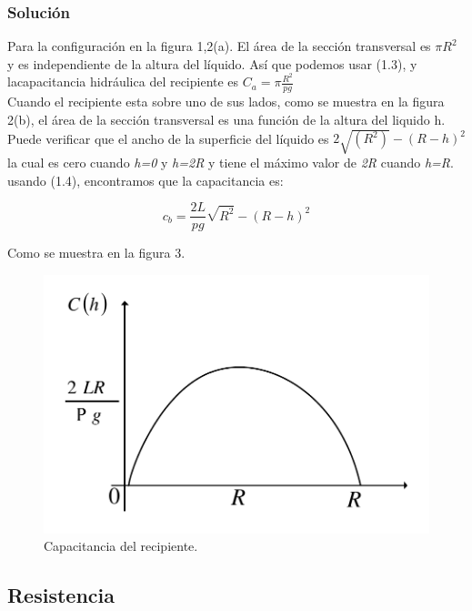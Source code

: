 \documentclass[a4paper,12pt,twoside]{proyectotanquesecci}
\begin{document}
\subsubsection{Solución}

Para la configuración en la figura 1,2(a). El área de la sección transversal es ${\pi R^{2}}$ y es independiente de la altura del líquido. Así que podemos usar (1.3), y lacapacitancia hidráulica del recipiente es $C_{a}=\pi\frac{R^{2}}{pg}$ \\

Cuando el recipiente esta sobre uno de sus lados, como se muestra en la figura 2(b), el área de la sección transversal es una función de la altura del liquido h. Puede verificar que el ancho de la superficie del líquido es $2\sqrt{(R^{2})}-(R-h)^{2}$ la cual es cero cuando \textit{h=0} y \textit{h=2R} y tiene el máximo valor de \textit{2R} cuando \textit{h=R}. usando (1.4), encontramos que la capacitancia es:

\begin{equation}
c_{b}=\frac{2L}{pg}\sqrt{R^{2}}-(R-h)^{2}
\label{Ecu 4}
\end{equation}

Como se muestra en la figura 3.

\begin{figure}[h]
\centering
\includegraphics[scale=0.5]{Figura3}
\renewcommand{\figurename}{Fig.}
\caption{Capacitancia del recipiente.}
\label{Capacitancia del recipiente.}
\end{figure}

\subsection{Resistencia}
\end{document}

